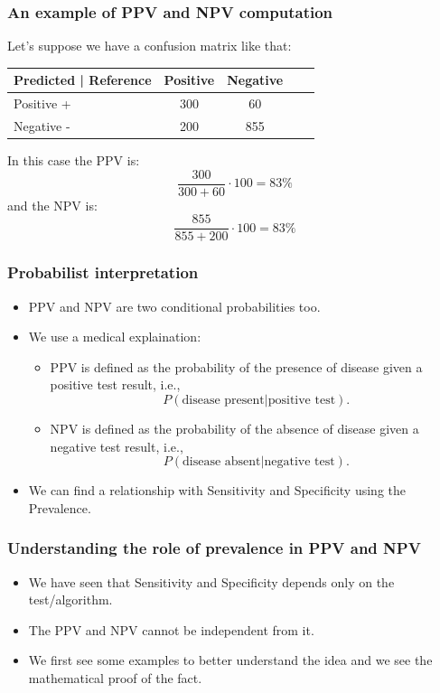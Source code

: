 \documentclass[9pt]{beamer}
\begin{document}
\begin{frame}
\frametitle{An example of PPV and NPV computation}
Let's suppose we have a confusion matrix like that:
\begin{table}
\begin{tabular}{l | c | c | c | c }
Predicted | Reference & Positive & Negative \\
\hline \hline
Positive + & 300 & 60 \\ 
Negative - & 200 & 855 \\
\end{tabular}
\end{table}
In this case the PPV is:
$$
\dfrac{300}{300 + 60}\cdot 100 = 83 \% 
$$
and the NPV is:
$$
\dfrac{855}{855 + 200}\cdot 100 = 83 \% 
$$
\end{frame}

\begin{frame}
\frametitle{Probabilist interpretation}
\begin{itemize}
\item PPV and NPV are two conditional probabilities too.
\item We use a medical explaination:
\begin{itemize}
\item PPV is defined as the probability of the presence of disease given a positive test result, i.e., $$P(\mbox{disease present} | \mbox{positive test}).$$
\item NPV is defined as the probability of the absence of disease given a negative test result, i.e., $$P(\mbox{disease absent}| \mbox{negative test}).$$
\end{itemize}
\item We can find a relationship with Sensitivity and Specificity using the Prevalence. 
\end{itemize}
\end{frame}

\begin{frame}
\frametitle{Understanding the role of prevalence in PPV and NPV}
\begin{itemize}
\item We have seen that Sensitivity and Specificity depends only on the test/algorithm.
\item The PPV and NPV cannot be independent from it.
\item We first see some examples to better understand the idea and we see the mathematical proof of the fact.
\end{itemize}
\end{frame}
\end{document}
